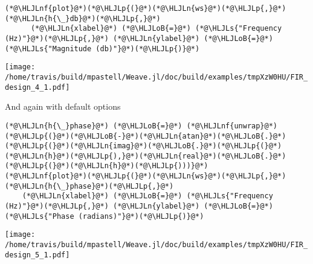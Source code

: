 \documentclass[12pt,a4paper]{article}
\newcommand{\HLJLn}[1]{#1}
\newcommand{\HLJLnf}[1]{\textcolor[RGB]{66,102,213}{#1}}
\newcommand{\HLJLs}[1]{\textcolor[RGB]{201,61,57}{#1}}
\newcommand{\HLJLoB}[1]{\textcolor[RGB]{102,102,102}{\textbf{#1}}}
\newcommand{\HLJLp}[1]{#1}
\begin{document}
\begin{lstlisting}
(*@\HLJLnf{plot}@*)(*@\HLJLp{(}@*)(*@\HLJLn{ws}@*)(*@\HLJLp{,}@*) (*@\HLJLn{h{\_}db}@*)(*@\HLJLp{,}@*)
      (*@\HLJLn{xlabel}@*) (*@\HLJLoB{=}@*) (*@\HLJLs{"Frequency (Hz)"}@*)(*@\HLJLp{,}@*) (*@\HLJLn{ylabel}@*) (*@\HLJLoB{=}@*) (*@\HLJLs{"Magnitude (db)"}@*)(*@\HLJLp{)}@*)
\end{lstlisting}

\texttt{[image: /home/travis/build/mpastell/Weave.jl/doc/build/examples/tmpXzW0HU/FIR\_design\_4\_1.pdf]}

And again with default options


\begin{lstlisting}
(*@\HLJLn{h{\_}phase}@*) (*@\HLJLoB{=}@*) (*@\HLJLnf{unwrap}@*)(*@\HLJLp{(}@*)(*@\HLJLoB{-}@*)(*@\HLJLn{atan}@*)(*@\HLJLoB{.}@*)(*@\HLJLp{(}@*)(*@\HLJLn{imag}@*)(*@\HLJLoB{.}@*)(*@\HLJLp{(}@*)(*@\HLJLn{h}@*)(*@\HLJLp{),}@*)(*@\HLJLn{real}@*)(*@\HLJLoB{.}@*)(*@\HLJLp{(}@*)(*@\HLJLn{h}@*)(*@\HLJLp{)))}@*)
(*@\HLJLnf{plot}@*)(*@\HLJLp{(}@*)(*@\HLJLn{ws}@*)(*@\HLJLp{,}@*) (*@\HLJLn{h{\_}phase}@*)(*@\HLJLp{,}@*)
    (*@\HLJLn{xlabel}@*) (*@\HLJLoB{=}@*) (*@\HLJLs{"Frequency (Hz)"}@*)(*@\HLJLp{,}@*) (*@\HLJLn{ylabel}@*) (*@\HLJLoB{=}@*) (*@\HLJLs{"Phase (radians)"}@*)(*@\HLJLp{)}@*)
\end{lstlisting}

\texttt{[image: /home/travis/build/mpastell/Weave.jl/doc/build/examples/tmpXzW0HU/FIR\_design\_5\_1.pdf]}
\end{document}
